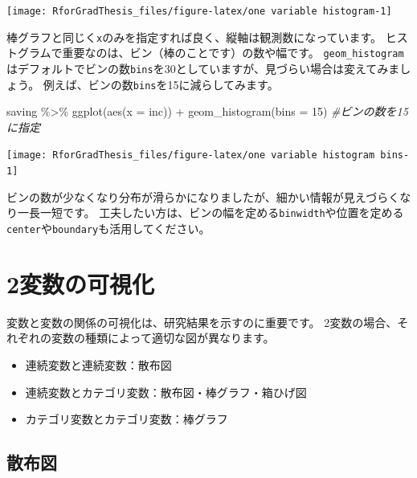 \documentclass[
]{book}
\newenvironment{Shaded}{\begin{snugshade}}{\end{snugshade}}
\newcommand{\AttributeTok}[1]{\textcolor[rgb]{0.77,0.63,0.00}{#1}}
\newcommand{\CommentTok}[1]{\textcolor[rgb]{0.56,0.35,0.01}{\textit{#1}}}
\newcommand{\DecValTok}[1]{\textcolor[rgb]{0.00,0.00,0.81}{#1}}
\newcommand{\FunctionTok}[1]{\textcolor[rgb]{0.00,0.00,0.00}{#1}}
\newcommand{\NormalTok}[1]{#1}
\newcommand{\SpecialCharTok}[1]{\textcolor[rgb]{0.00,0.00,0.00}{#1}}
\providecommand{\tightlist}{%
  \setlength{\itemsep}{0pt}\setlength{\parskip}{0pt}}
\begin{document}
\begin{center}\texttt{[image: RforGradThesis\_files/figure-latex/one variable histogram-1]} \end{center}

棒グラフと同じく\texttt{x}のみを指定すれば良く、縦軸は観測数になっています。
ヒストグラムで重要なのは、ビン（棒のことです）の数や幅です。
\texttt{geom\_histogram}はデフォルトでビンの数\texttt{bins}を30としていますが、見づらい場合は変えてみましょう。
例えば、ビンの数\texttt{bins}を15に減らしてみます。

\begin{Shaded}
\begin{Highlighting}[]
\NormalTok{saving }\SpecialCharTok{\%\textgreater{}\%}
  \FunctionTok{ggplot}\NormalTok{(}\FunctionTok{aes}\NormalTok{(}\AttributeTok{x =}\NormalTok{ inc)) }\SpecialCharTok{+}
  \FunctionTok{geom\_histogram}\NormalTok{(}\AttributeTok{bins =} \DecValTok{15}\NormalTok{) }\CommentTok{\#ビンの数を15に指定}
\end{Highlighting}
\end{Shaded}

\begin{center}\texttt{[image: RforGradThesis\_files/figure-latex/one variable histogram bins-1]} \end{center}

ビンの数が少なくなり分布が滑らかになりましたが、細かい情報が見えづらくなり一長一短です。
工夫したい方は、ビンの幅を定める\texttt{binwidth}や位置を定める\texttt{center}や\texttt{boundary}も活用してください。

\hypertarget{ux5909ux6570ux306eux53efux8996ux5316-1}{%
\section{2変数の可視化}\label{ux5909ux6570ux306eux53efux8996ux5316-1}}

変数と変数の関係の可視化は、研究結果を示すのに重要です。
2変数の場合、それぞれの変数の種類によって適切な図が異なります。

\begin{itemize}
\tightlist
\item
  連続変数と連続変数：散布図
\item
  連続変数とカテゴリ変数：散布図・棒グラフ・箱ひげ図
\item
  カテゴリ変数とカテゴリ変数：棒グラフ
\end{itemize}

\hypertarget{ux6563ux5e03ux56f3}{%
\subsection{散布図}\label{ux6563ux5e03ux56f3}}
\end{document}
